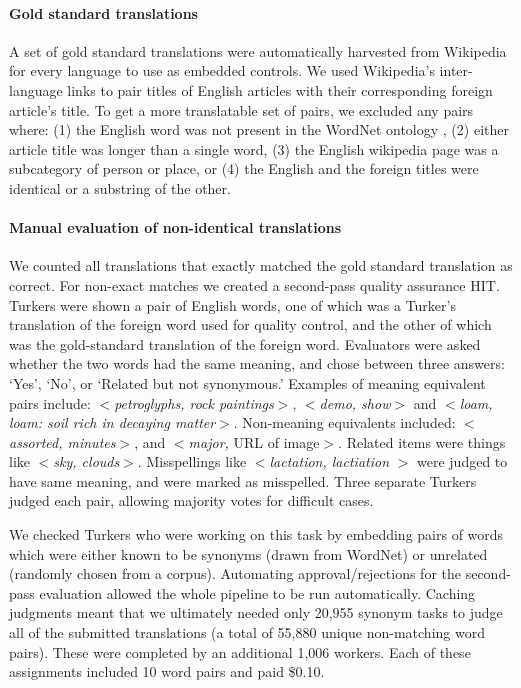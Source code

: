 \documentclass[11pt]{article}
\begin{document}
\paragraph{Gold standard translations} 
A set of gold standard translations were automatically harvested from Wikipedia  for every language to use as embedded controls. We used Wikipedia's inter-language links to pair titles of English articles with their corresponding foreign article's title.  To get a more translatable set of pairs, we excluded any pairs where: (1) the English word was not present in the WordNet ontology  \cite{miller1995wordnet}, (2) either article title was longer than a single word, (3) the English wikipedia page was a subcategory of person or place, or (4) the English and the foreign titles were identical or a substring of the other.

\paragraph{Manual evaluation of non-identical translations}
We counted all translations that exactly matched the gold standard translation as correct.  For non-exact matches we created a second-pass quality assurance HIT.  
Turkers were shown a pair of English words, one of which was a Turker's translation of the foreign word used for quality control, and the other of which was the gold-standard translation of the foreign word. Evaluators were asked whether the two words had the same meaning, and chose between three answers: `Yes', `No', or `Related but not synonymous.'  Examples of meaning equivalent pairs include: $<${\it petroglyphs, rock paintings}$>$, $<${\it demo, show}$>$ and  $<${\it loam, loam: soil rich in decaying matter}$>$.  Non-meaning equivalents included: $<${\it assorted, minutes}$>$, and $<${\it major,} URL of image$>$.  Related items were things like $<${\it sky, clouds}$>$. Misspellings like $<${\it lactation, lactiation} $>$ were judged to have same meaning, and were marked as misspelled.   Three separate Turkers judged each pair, allowing majority votes for difficult cases. 


We checked Turkers who were working on this task by embedding pairs of words which were either known to be synonyms (drawn from WordNet) or  unrelated (randomly chosen from a corpus). 
Automating approval/rejections for the second-pass evaluation allowed the whole pipeline to be run automatically.  Caching judgments meant that we ultimately needed only 
20,955 synonym tasks to judge all of the submitted translations (a total of 55,880 unique non-matching word pairs).  These were completed by an additional 1,006 workers.  Each of these assignments included 10 word pairs and paid \$0.10.
\end{document}
